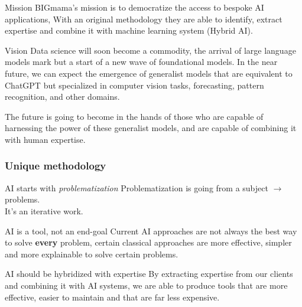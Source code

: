 \documentclass{beamer}
\begin{document}
\begin{frame}
    \begin{block}{Mission}
        BIGmama's mission is to democratize the access to bespoke AI applications, 
        With an original methodology they are able to identify, extract expertise and combine it with machine learning system 
        (Hybrid AI).
    \end{block}

    \begin{block}{Vision}
        Data science will soon become a commodity, the arrival of large language models
        mark but a start of a new wave of foundational models. 
        In the near future, we can expect the emergence of generalist models that are equivalent to ChatGPT but specialized in computer vision tasks, 
        forecasting, pattern recognition, and other domains.
    \end{block}

    \begin{exampleblock}{}
        The future is going to become in the hands of those who are capable of harnessing the power of these
        generalist models, and are capable of combining it with human expertise. 
    \end{exampleblock}
\end{frame}

\begin{frame}
    \frametitle{Unique methodology}
    \begin{block}{AI starts with \textit{problematization}}
    Problematization is going from a subject $\rightarrow$ problems. \\ 
    It's an iterative work. 
    \end{block}

    \begin{block}{AI is a tool, not an end-goal}
        Current AI approaches are not always the best way to solve \textbf{every} problem,
        certain classical approaches are more effective, simpler and more explainable to solve certain problems. 
    \end{block}

    \begin{block}{AI should be hybridized with expertise}
        By extracting expertise from our clients and combining it with AI systems, we are able to produce
        tools that are more effective, easier to maintain and that are far less expensive.
    \end{block}
\end{frame}
\end{document}
